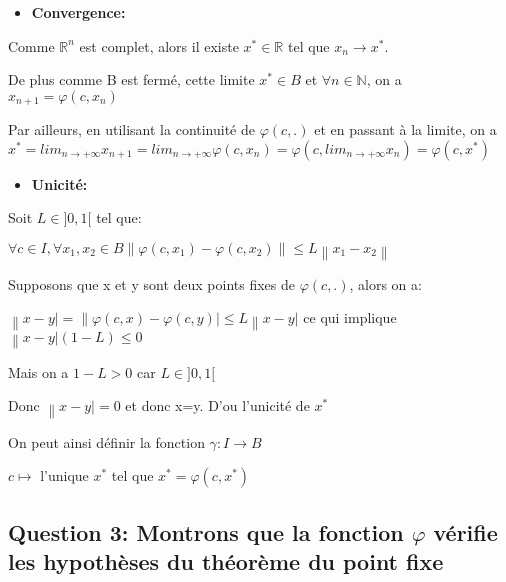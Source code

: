 \documentclass[11pt]{article}
\providecommand{\tightlist}{%
      \setlength{\itemsep}{0pt}\setlength{\parskip}{0pt}}
\begin{document}
\begin{itemize}
\tightlist
\item
  \textbf{Convergence:}
\end{itemize}

Comme \(\mathbb{R}^n\) est complet, alors il existe
\(x^* \in \mathbb{R}\) tel que \(x_n \longrightarrow x^*\).

De plus comme B est fermé, cette limite \(x^* \in B\) et
\(\forall n\in \mathbb{N}\), on a \(x_{n+1}=\varphi(c,x_n)\)

Par ailleurs, en utilisant la continuité de \(\varphi(c,.)\) et en
passant à la limite, on a
\(x^*=lim_{n \longrightarrow +\infty}x_{n+1}=lim_{n \longrightarrow +\infty} \varphi (c,x_n)=\varphi (c, lim_{n \longrightarrow +\infty} x_n)=\varphi (c,x^*)\)

\begin{itemize}
\tightlist
\item
  \textbf{Unicité:}
\end{itemize}

Soit \(L\in ]0,1[\) tel que:

\(\forall c\in I, \forall x_1,x_2 \in B \left\lVert \varphi(c,x_1) -\varphi(c,x_2)\right\rVert \leqslant L\left\lVert x_1-x_2\right\rVert\)

Supposons que x et y sont deux points fixes de \(\varphi (c,.)\), alors
on a:

\(\left\lVert x-y \right\lvert=\left\lVert \varphi (c,x)-\varphi(c,y) \right\lvert \leqslant L\left\lVert x-y \right\lvert\)
ce qui implique \(\left\lVert x-y \right\lvert(1-L) \leqslant 0\)

Mais on a \(1-L>0\) car \(L\in ]0,1[\)

Donc \(\left\lVert x-y \right\lvert=0\) et donc x=y. D'ou l'unicité de
\(x^*\)

On peut ainsi définir la fonction \(\gamma:I\longrightarrow B\)

\(c\longmapsto\) l'unique \(x^*\) tel que \(x^*=\varphi (c,x^*)\)

    \hypertarget{question-3-montrons-que-la-fonction-varphi-vuxe9rifie-les-hypothuxe8ses-du-thuxe9oruxe8me-du-point-fixe}{%
\subsection{\texorpdfstring{\textbf{Question 3: Montrons que la fonction
\(\varphi\) vérifie les hypothèses du théorème du point
fixe}}{Question 3: Montrons que la fonction \textbackslash{}varphi vérifie les hypothèses du théorème du point fixe}}\label{question-3-montrons-que-la-fonction-varphi-vuxe9rifie-les-hypothuxe8ses-du-thuxe9oruxe8me-du-point-fixe}}
\end{document}
